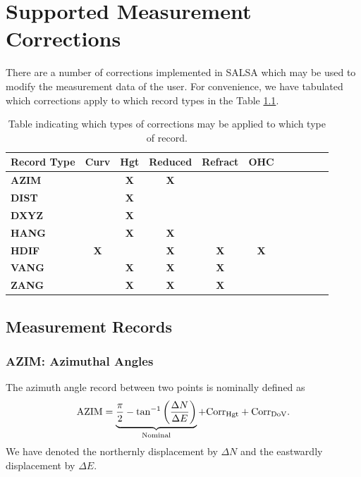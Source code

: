 \chapter{Supported Measurement Corrections}
\label{chap:corrections}
There are a number of corrections implemented in SALSA which may be used to modify the measurement data of the user.  For convenience, we have tabulated which corrections apply to which record types in the Table \ref{tab:corrections}.
\begin{table}[!htbp]
\centering
\begin{tabular}{|l|c|c|c|c|c|c|c|c|c|c|}\hline
\tiny{\textbf{Record Type}}&\tiny{\textbf{Curv}}&\tiny{\textbf{Hgt}}&\tiny{\textbf{Reduced}}&\tiny{\textbf{Refract}}&\tiny{\textbf{OHC}}\\\hline
\tiny{\textbf{AZIM}}&&\tiny{\textbf{X}}&\tiny{\textbf{X}}&&\\\hline
\tiny{\textbf{DIST}}&&\tiny{\textbf{X}}&&&\\\hline
\tiny{\textbf{DXYZ}}&&\tiny{\textbf{X}}&&&\\\hline
\tiny{\textbf{HANG}}&&\tiny{\textbf{X}}&\tiny{\textbf{X}}&&\\\hline
\tiny{\textbf{HDIF}}&\tiny{\textbf{X}}&&\tiny{\textbf{X}}&\tiny{\textbf{X}}&\tiny{\textbf{X}}\\\hline
\tiny{\textbf{VANG}}&&\tiny{\textbf{X}}&\tiny{\textbf{X}}&\tiny{\textbf{X}}&\\\hline
\tiny{\textbf{ZANG}}&&\tiny{\textbf{X}}&\tiny{\textbf{X}}&\tiny{\textbf{X}}&\\\hline
\end{tabular}
\caption{Table indicating which types of corrections may be applied to which type of record.}
\label{tab:corrections}
\end{table}
\section{Measurement Records}
\subsection{AZIM: Azimuthal Angles} \label{subsection:AZIM}
The azimuth angle record between two points is nominally defined as
\begin{equation}
\text{AZIM} = \underbrace{\frac{\pi}{2}-\tan^{-1}\left(\frac{\Delta N}{\Delta E}\right)}_{\text{Nominal}}+\text{Corr}_{\text{Hgt}}+\text{Corr}_{\text{DoV}}.
\end{equation}
We have denoted the northernly displacement by $\Delta N$ and the eastwardly displacement by $\Delta E$.
